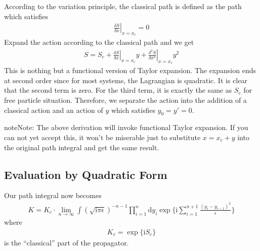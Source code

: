 \documentclass[letterpaper,10pt,english]{sphinxmanual}
\begin{document}
According to the variation principle, the classical path is defined as the path which satisfies
\begin{equation*}
\begin{split}\left.\frac{\delta S}{\delta x}\right|_{x=x_c} = 0\end{split}
\end{equation*}
Expand the action according to the classical path and we get
\begin{equation*}
\begin{split}S = S_c + \left.\frac{\delta S}{\delta x}\right|_{x=x_c} y + \left.\frac{\delta^2 S}{\delta x^2}\right|_{x=x_c}y^2\end{split}
\end{equation*}
This is nothing but a functional version of Taylor expansion. The expansion ends at second order since for most systems, the Lagrangian is quadratic. It is clear that the second term is zero. For the third term, it is exactly the same as \(S_c\) for free particle situation. Therefore, we separate the action into the addition of a classical action and an action of \(y\) which satisfies \(y_0 = y' = 0\).

\begin{sphinxadmonition}{note}{Note:}
The above derivation will invoke functional Taylor expansion. If you can not yet accept this, it won't be miserable just to substitute \(x = x_c + y\) into the original path integral and get the same result.
\end{sphinxadmonition}


\subsection{Evaluation by Quadratic Form}
\label{\detokenize{pi_eval:evaluation-by-quadratic-form}}
Our path integral now becomes
\begin{equation*}
\begin{split}K = K_c \cdot \lim_{n\rightarrow\infty}\int (\sqrt{\mathrm{i}\pi\epsilon})^{-n-1}\prod_{i=1}^{n}\mathrm{d}y_i\exp\{\mathrm{i}\sum_{i=1}^{n+1}\frac{(y_i-y_{i-1})^2}{\epsilon}\}\end{split}
\end{equation*}
where
\begin{equation*}
\begin{split}K_c = \exp\{\mathrm{i}S_c\}\end{split}
\end{equation*}
is the ``classical'' part of the propagator.
\end{document}
